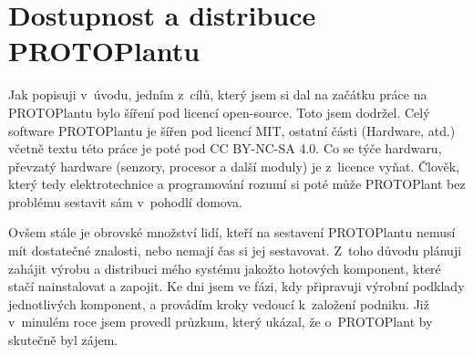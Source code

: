 \chapter{Dostupnost a distribuce PROTOPlantu}
Jak popisuji v~úvodu, jedním z~cílů, který jsem si dal na začátku práce na PROTOPlantu bylo šíření pod licencí open-source.
Toto jsem dodržel. 
Celý software PROTOPlantu je šířen pod licencí MIT, ostatní části (Hardware, atd.) včetně textu této práce je poté pod CC BY-NC-SA 4.0.
Co se týče hardwaru, převzatý hardware (senzory, procesor a další moduly) je z~licence vyňat.
Člověk, který tedy elektrotechnice a programování rozumí si poté může PROTOPlant bez problému sestavit sám v~pohodlí domova.

Ovšem stále je obrovské množství lidí, kteří na sestavení PROTOPlantu nemusí mít dostatečné znalosti, nebo nemají čas si jej sestavovat.
Z~toho důvodu plánuji zahájit výrobu a distribuci mého systému jakožto hotových komponent, které stačí nainstalovat a zapojit.
Ke dni  jsem ve fázi, kdy připravuji výrobní podklady jednotlivých komponent, a provádím kroky vedoucí k~založení podniku.
Již v~minulém roce jsem provedl průzkum, který ukázal, že o~PROTOPlant by skutečně byl zájem.

\newpage